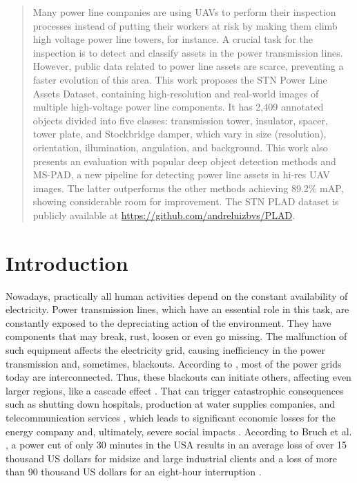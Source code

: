 \documentclass[10pt,conference]{IEEEtran}
\begin{document}
\begin{abstract}
Many power line companies are using UAVs to perform their inspection processes instead of putting their workers at risk by making them climb high voltage power line towers, for instance. A crucial task for the inspection is to detect and classify assets in the power transmission lines. However, public data related to power line assets are scarce, preventing a faster evolution of this area. This work proposes the STN Power Line Assets Dataset, containing high-resolution and real-world images of multiple high-voltage power line components. It has 2,409 annotated objects divided into five classes: transmission tower, insulator, spacer, tower plate, and Stockbridge damper, which vary in size (resolution), orientation, illumination, angulation, and background. This work also presents an evaluation with popular deep object detection methods and MS-PAD, a new pipeline for detecting power line assets in hi-res UAV images. The latter outperforms the other methods achieving 89.2\% mAP, showing considerable room for improvement. The STN PLAD dataset is publicly available at \url{https://github.com/andreluizbvs/PLAD}.
\end{abstract}










\section{Introduction}

Nowadays, practically all human activities depend on the constant availability of electricity. Power transmission lines, which have an essential role in this task, are constantly exposed to the depreciating action of the environment. They have components that may break, rust, loosen or even go missing. The malfunction of such equipment affects the electricity grid, causing inefficiency in the power transmission and, sometimes, blackouts. According to \cite{nguyen2018automatic}, most of the power grids today are interconnected. Thus, these blackouts can initiate others, affecting even larger regions, like a cascade effect \cite{pradeep2012high}. That can trigger catastrophic consequences such as shutting down hospitals, production at water supplies companies, and telecommunication services \cite{castillo2014risk}, which leads to significant economic losses for the energy company and, ultimately, severe social impacts \cite{bruch2011power,li2020state}. According to Bruch et al. \cite{bruch2011power}, a power cut of only 30 minutes in the USA results in an average loss of over 15 thousand US dollars for midsize and large industrial clients and a loss of more than 90 thousand US dollars for an eight-hour interruption \cite{nguyen2018automatic}.
\end{document}
